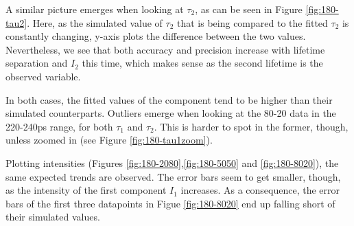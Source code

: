 A similar picture emerges when looking at $\tau_2$, as can be seen in Figure \ref{fig:180-tau2}. Here, as the simulated value of $\tau_2$ that is being compared to the fitted $\tau_2$ is constantly changing, y-axis plots the difference between the two values. Nevertheless, we see that both accuracy and precision increase with lifetime separation and $I_2$ this time, which makes sense as the second lifetime is the observed variable.

In both cases, the fitted values of the component tend to be higher than their simulated counterparts. Outliers emerge when looking at the 80-20 data in the 220-240ps range, for both $\tau_1$ and $\tau_2$. This is harder to spot in the former, though, unless zoomed in (see Figure \ref{fig:180-tau1zoom}).

Plotting intensities (Figures \ref{fig:180-2080},\ref{fig:180-5050} and \ref{fig:180-8020}), the same expected trends are observed. The error bars seem to get smaller, though, as the intensity of the first component $I_1$ increases. As a consequence, the error bars of the first three datapoints in Figue \ref{fig:180-8020} end up falling short of their simulated values.

